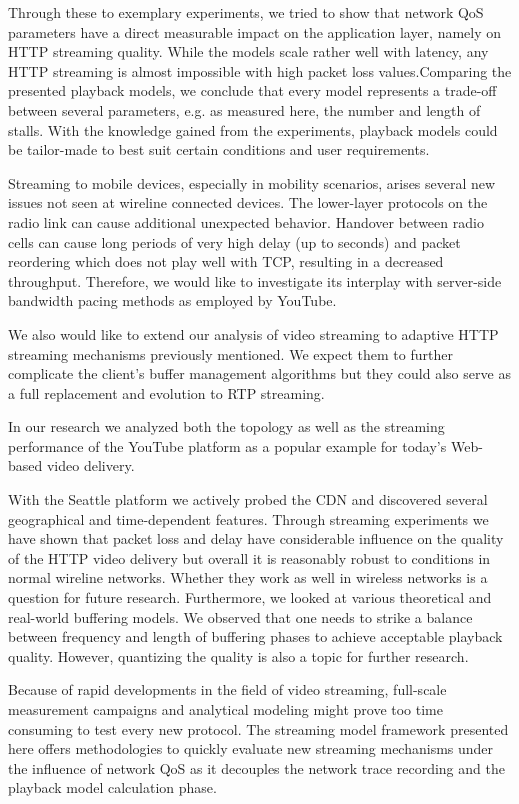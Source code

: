 Through these to exemplary experiments, we tried to show that network QoS parameters have a direct measurable impact on the application layer, namely on HTTP streaming quality. While the models scale rather well with latency, any HTTP streaming is almost impossible with high packet loss values.Comparing the presented playback models, we conclude that every model represents a trade-off between several parameters, e.g. as measured here, the number and length of stalls. With the knowledge gained from the experiments, playback models could be tailor-made to best suit certain conditions and user requirements. 
%

Streaming to mobile devices, especially in mobility scenarios, arises several new issues not seen at wireline connected devices. The lower-layer protocols on the radio link can cause additional unexpected behavior. Handover between radio cells can cause long periods of very high delay (up to seconds) and packet reordering which does not play well with TCP, resulting in a decreased throughput. Therefore, we would like to investigate its interplay with server-side bandwidth pacing methods as employed by YouTube.

We also would like to extend our analysis of video streaming to adaptive HTTP streaming mechanisms previously mentioned. We expect them to further complicate the client's buffer management algorithms but they could also serve as a full replacement and evolution to RTP streaming.

In our research we analyzed both the topology as well as the streaming performance of the YouTube platform as a popular example for today's Web-based video delivery. 

With the Seattle platform we actively probed the CDN and discovered several geographical and time-dependent features. Through streaming experiments we have shown that packet loss and delay have considerable influence on the quality of the HTTP video delivery but overall it is reasonably robust to conditions in normal wireline networks. Whether they work as well in wireless networks is a question for future research. Furthermore, we looked at various theoretical and real-world buffering models. We observed that one needs to strike a balance between frequency and length of buffering phases to achieve acceptable playback quality. However, quantizing the quality is also a topic for further research.

Because of rapid developments in the field of video streaming, full-scale measurement campaigns and analytical modeling might prove too time consuming to test every new protocol. The streaming model framework presented here offers methodologies to quickly evaluate new streaming mechanisms under the influence of network QoS as it decouples the network trace recording and the playback model calculation phase.

